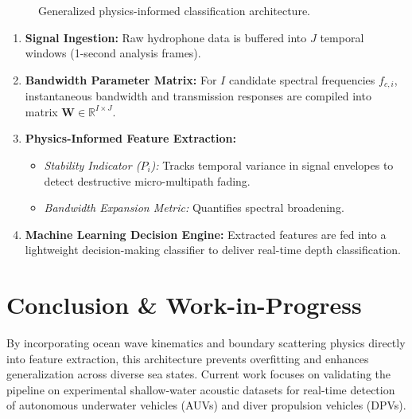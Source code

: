 \documentclass[11pt,a4paper]{article}
\begin{document}
\begin{figure}[h!]
\centering
{}
\caption{Generalized physics-informed classification architecture.}
\label{fig:pipeline}
\end{figure}

\begin{enumerate}
    \setlength{\itemsep}{2pt}
    \item \textbf{Signal Ingestion:} Raw hydrophone data is buffered into $J$ temporal windows (1-second analysis frames).
    \item \textbf{Bandwidth Parameter Matrix:} For $I$ candidate spectral frequencies $f_{c,i}$, instantaneous bandwidth and transmission responses are compiled into matrix $\mathbf{W} \in \mathbb{R}^{I \times J}$.
    \item \textbf{Physics-Informed Feature Extraction:}
    \begin{itemize}
        \setlength{\itemsep}{1pt}
        \item \textit{Stability Indicator ($P_i$):} Tracks temporal variance in signal envelopes to detect destructive micro-multipath fading.
        \item \textit{Bandwidth Expansion Metric:} Quantifies spectral broadening.
    \end{itemize}
    \item \textbf{Machine Learning Decision Engine:} Extracted features are fed into a lightweight decision-making classifier to deliver real-time depth classification.
\end{enumerate}

\section{Conclusion \& Work-in-Progress}
By incorporating ocean wave kinematics and boundary scattering physics directly into feature extraction, this architecture prevents overfitting and enhances generalization across diverse sea states.
Current work focuses on validating the pipeline on experimental shallow-water acoustic datasets for real-time detection of autonomous underwater vehicles (AUVs) and diver propulsion vehicles (DPVs).
\end{document}
